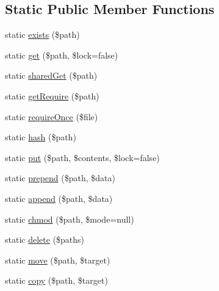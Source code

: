 \subsection*{Static Public Member Functions}
\begin{DoxyCompactItemize}
\item 
static \mbox{\hyperlink{class_illuminate_1_1_support_1_1_facades_1_1_file_a4b807c44b40f3f20c403e8bbed8b0a13}{exists}} (\$path)
\item 
static \mbox{\hyperlink{class_illuminate_1_1_support_1_1_facades_1_1_file_a4107d1371fced088f1d8cf9567462b2a}{get}} (\$path, \$lock=false)
\item 
static \mbox{\hyperlink{class_illuminate_1_1_support_1_1_facades_1_1_file_ae17d9ca36b3f2c31a3867bda05fd496d}{shared\+Get}} (\$path)
\item 
static \mbox{\hyperlink{class_illuminate_1_1_support_1_1_facades_1_1_file_a9d4a111e1e387d37a4dfdb3a2a1e551e}{get\+Require}} (\$path)
\item 
static \mbox{\hyperlink{class_illuminate_1_1_support_1_1_facades_1_1_file_a5f759ee620f8d2335fb6474bce2bae10}{require\+Once}} (\$file)
\item 
static \mbox{\hyperlink{class_illuminate_1_1_support_1_1_facades_1_1_file_a422b7ea35647d20d7d4937f0d30051dd}{hash}} (\$path)
\item 
static \mbox{\hyperlink{class_illuminate_1_1_support_1_1_facades_1_1_file_a3eecd0629a18f79867e78c128c3e8be4}{put}} (\$path, \$contents, \$lock=false)
\item 
static \mbox{\hyperlink{class_illuminate_1_1_support_1_1_facades_1_1_file_abb0f6b7ad9e25e7d4bab93b8452cd88a}{prepend}} (\$path, \$data)
\item 
static \mbox{\hyperlink{class_illuminate_1_1_support_1_1_facades_1_1_file_a7825529eea0804131cef0e9ae58b683d}{append}} (\$path, \$data)
\item 
static \mbox{\hyperlink{class_illuminate_1_1_support_1_1_facades_1_1_file_a8a69c6729054c846a7d524731c8c1401}{chmod}} (\$path, \$mode=null)
\item 
static \mbox{\hyperlink{class_illuminate_1_1_support_1_1_facades_1_1_file_ac679b60f28fd09f4489ed9c7f8864942}{delete}} (\$paths)
\item 
static \mbox{\hyperlink{class_illuminate_1_1_support_1_1_facades_1_1_file_afd1317f21e7e42c7e044422070ce9775}{move}} (\$path, \$target)
\item 
static \mbox{\hyperlink{class_illuminate_1_1_support_1_1_facades_1_1_file_a7f87dc02081585f2f2b3b6fe38d21c54}{copy}} (\$path, \$target)

\end{DoxyCompactItemize}
